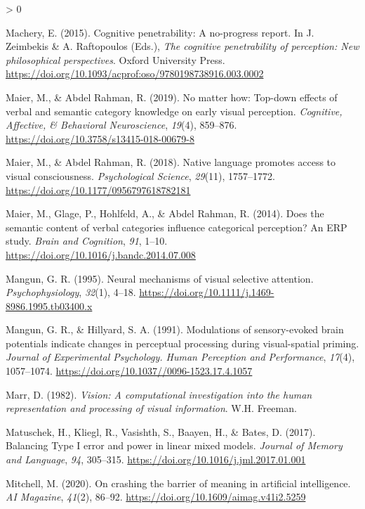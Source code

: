 \documentclass[
  english,
  man,floatsintext]{apa7}
\newlength{\cslhangindent}
\newenvironment{CSLReferences}[2] %
 {%
  \setlength{\parindent}{0pt}
  \ifodd #1 \everypar{\setlength{\hangindent}{\cslhangindent}}\ignorespaces\fi
  \ifnum #2 > 0
  \setlength{\parskip}{#2\baselineskip}
  \fi
 }%
 {}
\begin{document}
\begin{CSLReferences}{1}{0}
\leavevmode\hypertarget{ref-machery2015}{}%
Machery, E. (2015). Cognitive penetrability: A no-progress report. In J. Zeimbekis \& A. Raftopoulos (Eds.), \emph{The cognitive penetrability of perception: New philosophical perspectives}. Oxford University Press. \url{https://doi.org/10.1093/acprof:oso/9780198738916.003.0002}

\leavevmode\hypertarget{ref-maier2019}{}%
Maier, M., \& Abdel Rahman, R. (2019). No matter how: Top-down effects of verbal and semantic category knowledge on early visual perception. \emph{Cognitive, Affective, \& Behavioral Neuroscience}, \emph{19}(4), 859--876. \url{https://doi.org/10.3758/s13415-018-00679-8}

\leavevmode\hypertarget{ref-maier2018}{}%
Maier, M., \& Abdel Rahman, R. (2018). Native language promotes access to visual consciousness. \emph{Psychological Science}, \emph{29}(11), 1757--1772. \url{https://doi.org/10.1177/0956797618782181}

\leavevmode\hypertarget{ref-maier2014}{}%
Maier, M., Glage, P., Hohlfeld, A., \& Abdel Rahman, R. (2014). Does the semantic content of verbal categories influence categorical perception? An {ERP} study. \emph{Brain and Cognition}, \emph{91}, 1--10. \url{https://doi.org/10.1016/j.bandc.2014.07.008}

\leavevmode\hypertarget{ref-mangun1995}{}%
Mangun, G. R. (1995). Neural mechanisms of visual selective attention. \emph{Psychophysiology}, \emph{32}(1), 4--18. \url{https://doi.org/10.1111/j.1469-8986.1995.tb03400.x}

\leavevmode\hypertarget{ref-mangun1991}{}%
Mangun, G. R., \& Hillyard, S. A. (1991). Modulations of sensory-evoked brain potentials indicate changes in perceptual processing during visual-spatial priming. \emph{Journal of Experimental Psychology. Human Perception and Performance}, \emph{17}(4), 1057--1074. \url{https://doi.org/10.1037//0096-1523.17.4.1057}

\leavevmode\hypertarget{ref-marr1982}{}%
Marr, D. (1982). \emph{Vision: A computational investigation into the human representation and processing of visual information}. W.H. Freeman.

\leavevmode\hypertarget{ref-matuschek2017}{}%
Matuschek, H., Kliegl, R., Vasishth, S., Baayen, H., \& Bates, D. (2017). Balancing {Type I} error and power in linear mixed models. \emph{Journal of Memory and Language}, \emph{94}, 305--315. \url{https://doi.org/10.1016/j.jml.2017.01.001}

\leavevmode\hypertarget{ref-mitchell2020}{}%
Mitchell, M. (2020). On crashing the barrier of meaning in artificial intelligence. \emph{AI Magazine}, \emph{41}(2), 86--92. \url{https://doi.org/10.1609/aimag.v41i2.5259}


\end{CSLReferences}
\end{document}
